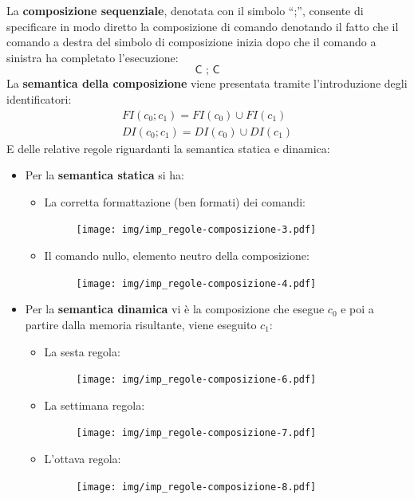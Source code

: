 \documentclass[a4paper]{article}
\newcommand{\dquotes}[1]{``#1''}
\begin{document}
 	La \textcolor{Red3}{\textbf{composizione sequenziale}}, denotata con il simbolo \dquotes{;}, consente di specificare in modo diretto la composizione di comando denotando il fatto che il comando a destra del simbolo di composizione inizia dopo che il comando a sinistra ha completato l'esecuzione:
 	\begin{equation*}
 		\textsf{C ; C}
 	\end{equation*}
 	La \textbf{semantica della composizione} viene presentata tramite l'introduzione degli identificatori:
 	\begin{gather*}
 		FI\left(c_{0} ; c_{1}\right) = FI\left(c_{0}\right) \cup FI\left(c_{1}\right) \\
 		DI\left(c_{0} ; c_{1}\right) = DI\left(c_{0}\right) \cup DI\left(c_{1}\right)
 	\end{gather*}
 	E delle relative regole riguardanti la semantica statica e dinamica:
 	\begin{itemize}
 		\item Per la \textbf{semantica statica} si ha:
 		\begin{itemize}
 			\item La corretta formattazione (ben formati) dei comandi:
 			\begin{figure}[!htp]
 				\centering
 				\texttt{[image: img/imp\_regole-composizione-3.pdf]}
 			\end{figure}\newpage
 			
 			\item Il comando nullo, elemento neutro della composizione:
 			\begin{figure}[!htp]
 				\centering
 				\texttt{[image: img/imp\_regole-composizione-4.pdf]}
 			\end{figure}
 		\end{itemize}
 		
 		\item Per la \textbf{semantica dinamica} vi è la composizione che esegue $c_{0}$ e poi a partire dalla memoria risultante, viene eseguito $c_{1}$:
 		\begin{itemize}
 			\item La sesta regola:
 			\begin{figure}[!htp]
 				\centering
 				\texttt{[image: img/imp\_regole-composizione-6.pdf]}
 			\end{figure}
 			
 			\item La settimana regola:
 			\begin{figure}[!htp]
 				\centering
 				\texttt{[image: img/imp\_regole-composizione-7.pdf]}
 			\end{figure}
 			
 			\item L'ottava regola:
 			\begin{figure}[!htp]
 				\centering
 				\texttt{[image: img/imp\_regole-composizione-8.pdf]}
 			\end{figure}
 		\end{itemize}
 	\end{itemize}
\end{document}
